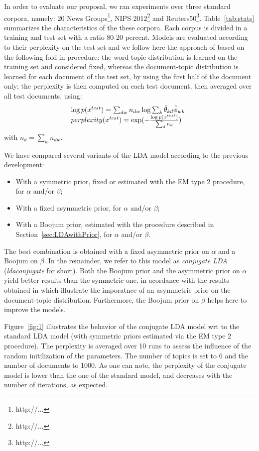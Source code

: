 In order to evaluate our proposal, we ran experiments over three standard corpora, namely: 20 News Groups\footnote{http://...}, NIPS 2012\footnote{http://...} and Reuters50\footnote{http://...}. Table~\ref{tab:stats} summarizes the characteristics of the these corpora. Each corpus is divided in a training and test set with a ratio 80-20 percent. Models are evaluated according to their perplexity on the test set and we follow here the  approach of \cite{asuncion_smoothing_2009} based on the following fold-in procedure: the word-topic distribution is learned on the training set and considered fixed, whereas the document-topic distribution is learned for each document of the test set, by using the first half of the document only; the perplexity is then computed on each test document, then averaged over all test documents, using:
%
\[
\begin{array}{l@{\hspace{.3cm}}l}
\log p(x^{test}) = \sum_{dw} n_{dw} \log \sum_k \hat{\theta}_{kd} \hat{\phi}_{wk} \\
perplexity(x^{test}) = \exp(- \frac{\log p(x^{test})}{\sum_d n_d})
\end{array}
\]
%
with $n_d = \sum_w n_{dw}$.

We have compared several variants of the LDA model according to the previous development:
%
\begin{itemize}
\item With a symmetric prior, fixed or estimated with the EM type 2 procedure, for $\alpha$ and/or $\beta$;
\item With a fixed asymmetric prior, for $\alpha$ and/or $\beta$;
\item With a Boojum prior, estimated with the procedure described in Section~\ref{sec:LDAwithPrior}, for $\alpha$ and/or $\beta$.
\end{itemize}
%
The best combination is obtained with a fixed asymmetric prior on $\alpha$ and a Boojum on $\beta$. In the remainder, we refer to this model as {\it conjugate LDA} ({\it ldaconjugate} for short). Both the Boojum prior and the asymmetric prior on $\alpha$ yield better results than the symmetric one, in acordance with the results obtained in \cite{wallach_rethinking_2009} which illustrate the imporatnce of an asymmetric prior on the document-topic distribution. Furthermore, the Boojum prior on $\beta$ helps here to improve the models.

Figure~\ref{fig:1} illustrates the behavior of the conjugate LDA model wrt to the standard LDA model (with symmetric priors estimated via the EM type 2 procedure). The perplexity is averaged over 10 runs to assess the influence of the random initilization of the parameters. The number of topics is set to 6 and the number of documents to 1000. As one can note, the perplexity of the conjugate model is lower than the one of the standard model, and decreases with the number of iterations, as expected.


